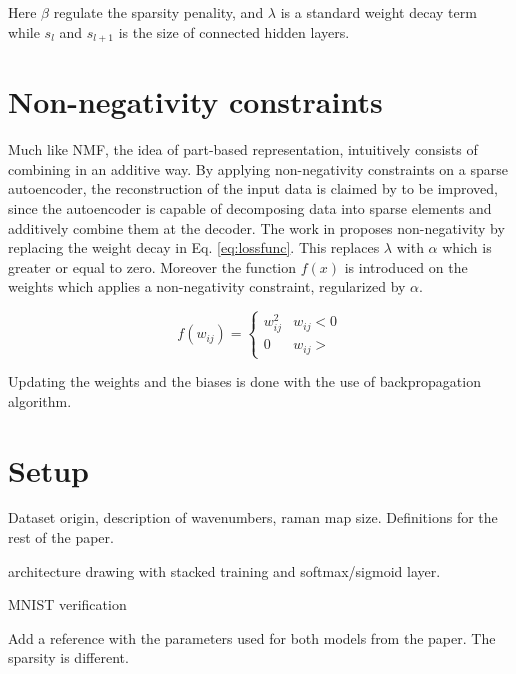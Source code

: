 \documentclass{article}
\begin{document}
Here $\beta$ regulate the sparsity penality, and $\lambda$ is a standard weight decay term while $s_l$ and $s_{l+1}$ is the size of connected hidden layers. 

\section{Non-negativity constraints}
\label{sec:prior}

Much like NMF, the idea of part-based representation, intuitively consists of combining in an additive way. By applying non-negativity constraints on a sparse autoencoder, the reconstruction of the input data is claimed by \cite{Hosseini-Asl2016} to be improved, since the autoencoder is capable of decomposing data into sparse elements and additively combine them at the decoder. The work in \cite{Hosseini-Asl2016} proposes non-negativity by replacing the weight decay in Eq. \ref{eq:lossfunc}. This replaces $\lambda$ with $\alpha$ which is greater or equal to zero. Moreover the function $f(x)$ is introduced on the weights which applies a non-negativity constraint, regularized by $\alpha$. 

\begin{equation}
f(w_{ij}) = \begin{cases}
  w_{ij}^2 & w_{ij} < 0 \\
  0 & w_{ij} >
\end{cases} 
\end{equation}

Updating the weights and the biases is done with the use of backpropagation algorithm. 

\section{Setup}
\label{sec:setup}


Dataset origin, description of wavenumbers, raman map size. Definitions for the rest of the paper.

architecture drawing with stacked training and softmax/sigmoid layer.

MNIST verification

Add a reference with the parameters used for both models from the paper. The sparsity is different. %
\end{document}
